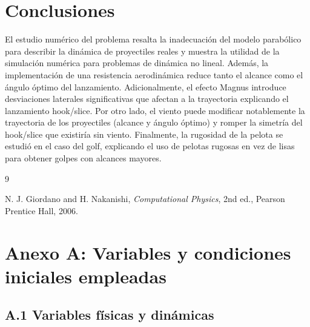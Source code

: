 \documentclass[11pt,a4paper]{article}
\begin{document}
\section{Conclusiones}

El estudio numérico del problema resalta la inadecuación del modelo parabólico para describir la dinámica de proyectiles reales y muestra la utilidad de la simulación numérica para problemas de dinámica no lineal. Además, la implementación de una resistencia aerodinámica reduce tanto el alcance como el ángulo óptimo del lanzamiento. Adicionalmente, el efecto Magnus introduce desviaciones laterales significativas que afectan a la trayectoria explicando el lanzamiento hook/slice. Por otro lado, el viento puede modificar notablemente la trayectoria de los proyectiles (alcance y ángulo óptimo) y romper la simetría del hook/slice que existiría sin viento. Finalmente, la rugosidad de la pelota se estudió en el caso del golf, explicando el uso de pelotas rugosas en vez de lisas para obtener golpes con alcances mayores. 

\begin{thebibliography}{9}

N. J. Giordano and H. Nakanishi,
\textit{Computational Physics},
2nd ed., Pearson Prentice Hall, 2006.

\end{thebibliography}

\newpage
\appendix
\section*{Anexo A: Variables y condiciones iniciales empleadas}


\subsection*{A.1 Variables físicas y dinámicas}
\end{document}
